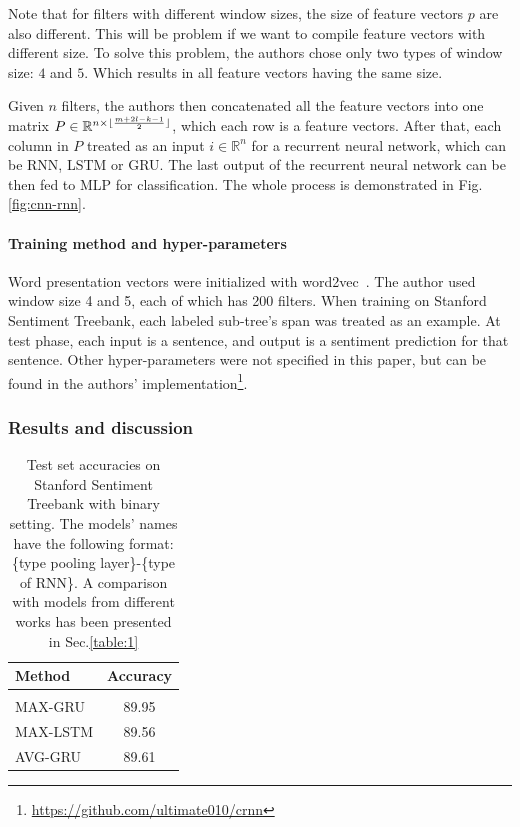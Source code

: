 Note that for filters with different window sizes, the size of feature vectors \(p\) are also different.
This will be problem if we want to compile feature vectors with different size.
To solve this problem, the authors chose only two types of window size: \(4\) and \(5\).
Which results in all feature vectors having the same size.

Given \(n\) filters, the authors then concatenated all the feature vectors into one matrix \(P \in \mathbb{R}^{n \times \lfloor \frac{m + 2l - k - 1}{2} \rfloor}\), which each row is a feature vectors.
After that, each column in \(P\) treated as an input \(i \in \mathbb{R}^{n}\) for a recurrent neural network, which can be RNN, LSTM or GRU.
The last output of the recurrent neural network can be then fed to MLP for classification.
The whole process is demonstrated in Fig.\ref{fig:cnn-rnn}.

\paragraph{Training method and hyper-parameters}
Word presentation vectors were initialized with word2vec~\cite{word2vec}.
The author used window size 4 and 5, each of which has 200 filters.
When training on Stanford Sentiment Treebank, each labeled sub-tree's span was treated as an example.
At test phase, each input is a sentence, and output is a sentiment prediction for that sentence.
Other hyper-parameters were not specified in this paper, but can be found in the authors' implementation\footnote{\url{https://github.com/ultimate010/crnn}}.

\subsubsection{Results and discussion}
\begin{table}[H]
\centering
\begin{tabular}{l c}
 \hline
 \hline
 Method & Accuracy \\ [0.5ex]
 \hline
 \hline
 \\
 MAX-GRU & 89.95 \\
 MAX-LSTM & 89.56 \\
 AVG-GRU & 89.61 \\
 \hline
 \hline
\end{tabular}
\caption[CNN-RNN test result]{Test set accuracies on Stanford Sentiment Treebank with binary setting.
The models' names have the following format: \{type pooling layer\}-\{type of RNN\}.
A comparison with models from different works has been presented in Sec.\ref{table:1}}
\label{table:cnn-rnn}
\end{table}

